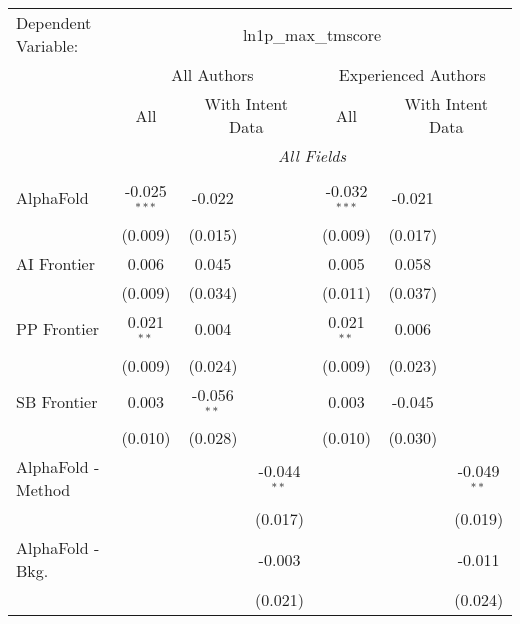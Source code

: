\begingroup
\centering
\begin{tabular}{lcccccc}
   \tabularnewline \midrule \midrule
   Dependent Variable: & \multicolumn{6}{c}{ln1p\_max\_tmscore}\\
 & \multicolumn{3}{c}{All Authors} & \multicolumn{3}{c}{Experienced Authors} \\
\cmidrule(lr){2-4} \cmidrule(lr){5-7}
 & \multicolumn{1}{c}{All} & \multicolumn{2}{c}{With Intent Data} & \multicolumn{1}{c}{All} & \multicolumn{2}{c}{With Intent Data} \\
\cmidrule(lr){2-2} \cmidrule(lr){3-4} \cmidrule(lr){5-5} \cmidrule(lr){6-7}
 & \multicolumn{6}{c}{\textit{All Fields}} \\ \\
   AlphaFold                     & -0.025$^{***}$ & -0.022        &                & -0.032$^{***}$ & -0.021  &   \\   
                                 & (0.009)        & (0.015)       &                & (0.009)        & (0.017) &   \\   
   AI Frontier                   & 0.006          & 0.045         &                & 0.005          & 0.058   &   \\   
                                 & (0.009)        & (0.034)       &                & (0.011)        & (0.037) &   \\   
   PP Frontier                   & 0.021$^{**}$   & 0.004         &                & 0.021$^{**}$   & 0.006   &   \\   
                                 & (0.009)        & (0.024)       &                & (0.009)        & (0.023) &   \\   
   SB Frontier                   & 0.003          & -0.056$^{**}$ &                & 0.003          & -0.045  &   \\   
                                 & (0.010)        & (0.028)       &                & (0.010)        & (0.030) &   \\   
   AlphaFold - Method            &                &               & -0.044$^{**}$  &                &         & -0.049$^{**}$\\   
                                 &                &               & (0.017)        &                &         & (0.019)\\   
   AlphaFold - Bkg.              &                &               & -0.003         &                &         & -0.011\\   
                                 &                &               & (0.021)        &                &         & (0.024)\\   

\end{tabular}
